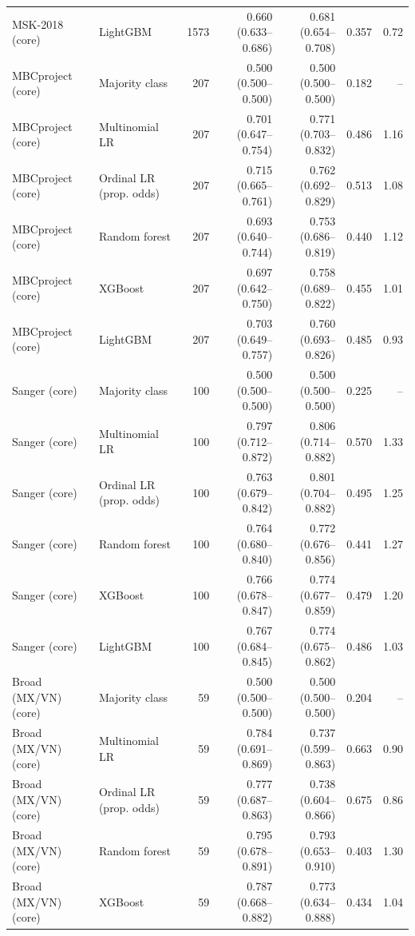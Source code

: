 \begin{tabular}{llrrrrr}
MSK-2018 (core) & LightGBM & 1573 & 0.660 (0.633--0.686) & 0.681 (0.654--0.708) & 0.357 & 0.72 \\
\addlinespace
MBCproject (core) & Majority class & 207 & 0.500 (0.500--0.500) & 0.500 (0.500--0.500) & 0.182 & -- \\
MBCproject (core) & Multinomial LR & 207 & 0.701 (0.647--0.754) & 0.771 (0.703--0.832) & 0.486 & 1.16 \\
MBCproject (core) & Ordinal LR (prop. odds) & 207 & 0.715 (0.665--0.761) & 0.762 (0.692--0.829) & 0.513 & 1.08 \\
MBCproject (core) & Random forest & 207 & 0.693 (0.640--0.744) & 0.753 (0.686--0.819) & 0.440 & 1.12 \\
MBCproject (core) & XGBoost & 207 & 0.697 (0.642--0.750) & 0.758 (0.689--0.822) & 0.455 & 1.01 \\
MBCproject (core) & LightGBM & 207 & 0.703 (0.649--0.757) & 0.760 (0.693--0.826) & 0.485 & 0.93 \\
\addlinespace
Sanger (core) & Majority class & 100 & 0.500 (0.500--0.500) & 0.500 (0.500--0.500) & 0.225 & -- \\
Sanger (core) & Multinomial LR & 100 & 0.797 (0.712--0.872) & 0.806 (0.714--0.882) & 0.570 & 1.33 \\
Sanger (core) & Ordinal LR (prop. odds) & 100 & 0.763 (0.679--0.842) & 0.801 (0.704--0.882) & 0.495 & 1.25 \\
Sanger (core) & Random forest & 100 & 0.764 (0.680--0.840) & 0.772 (0.676--0.856) & 0.441 & 1.27 \\
Sanger (core) & XGBoost & 100 & 0.766 (0.678--0.847) & 0.774 (0.677--0.859) & 0.479 & 1.20 \\
Sanger (core) & LightGBM & 100 & 0.767 (0.684--0.845) & 0.774 (0.675--0.862) & 0.486 & 1.03 \\
\addlinespace
Broad (MX/VN) (core) & Majority class & 59 & 0.500 (0.500--0.500) & 0.500 (0.500--0.500) & 0.204 & -- \\
Broad (MX/VN) (core) & Multinomial LR & 59 & 0.784 (0.691--0.869) & 0.737 (0.599--0.863) & 0.663 & 0.90 \\
Broad (MX/VN) (core) & Ordinal LR (prop. odds) & 59 & 0.777 (0.687--0.863) & 0.738 (0.604--0.866) & 0.675 & 0.86 \\
Broad (MX/VN) (core) & Random forest & 59 & 0.795 (0.678--0.891) & 0.793 (0.653--0.910) & 0.403 & 1.30 \\
Broad (MX/VN) (core) & XGBoost & 59 & 0.787 (0.668--0.882) & 0.773 (0.634--0.888) & 0.434 & 1.04 \\

\end{tabular}
